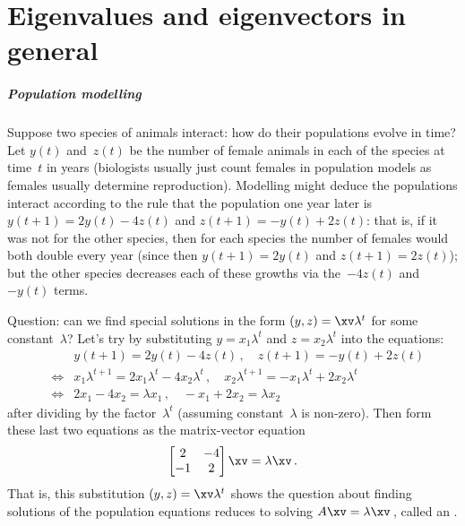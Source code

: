 
\chapter{Eigenvalues and eigenvectors in general}
\label{ch:gee}

\minitoc





\paragraph{Population modelling} 
Suppose two species of animals interact: how do their populations evolve in time?  
Let \(y(t)\) and~\(z(t)\) be the number of female animals in each of the species at time~\(t\) in years (biologists usually just count females in population models as females usually determine reproduction). 
Modelling might deduce the populations interact according to the rule that the population one year later is \(y(t+1)=2y(t)-4z(t)\) and \(z(t+1)=-y(t)+2z(t)\): that is, if it was not for the other species, then for each species the number of females would both double every year (since then \(y(t+1)=2y(t)\) and \(z(t+1)=2z(t)\)); but the other species decreases each of these growths via the~\(-4z(t)\) and~\(-y(t)\) terms.  

Question: can we find special solutions in the form \((y,z)=\xv \lambda^{t}\) for some constant~\(\lambda\)?  
Let's try by substituting \(y=x_1\lambda^{t}\) and \(z=x_2\lambda^{t}\) into the  equations:
\begin{eqnarray*}
&&y(t+1)=2y(t)-4z(t)\,,\quad z(t+1)=-y(t)+2z(t)
\\&\iff& 
x_1 \lambda^{t+1}=2x_1\lambda^{t}-4x_2\lambda^{t}
\,,\quad
x_2 \lambda^{t+1}=-x_1\lambda^{t}+2x_2\lambda^{t}
\\&\iff& 2x_1-4x_2=\lambda x_1
\,,\quad
-x_1+2x_2=\lambda x_2
\end{eqnarray*}
after dividing by the factor~\(\lambda^{t}\) (assuming constant~\(\lambda\) is non-zero).
Then form these last two equations as the matrix-vector equation
\begin{equation*}
\begin{bmatrix} 2&-4\\-1&2 \end{bmatrix}\xv=\lambda\xv\,.
\end{equation*}
That is, this substitution \((y,z)=\xv \lambda^{t}\) shows the question about finding solutions of the population equations reduces to solving \(A\xv=\lambda \xv\)\,, called an .

